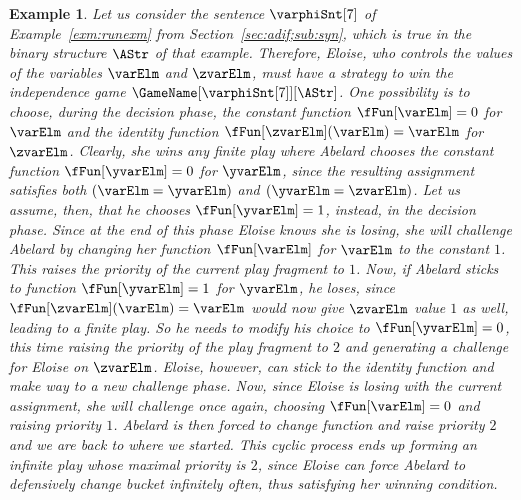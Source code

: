 \documentclass[authoryear]{elsarticle}
\newtheorem{example}{Example}
\begin{document}
\begin{example}
  \label{exm:runexmgam}
  Let us consider the sentence $\varphiSnt[7]$ of Example~\ref{exm:runexm} from
  Section~\ref{sec:adif;sub:syn}, which is true in the binary structure $\AStr$
  of that example.
  Therefore, Eloise, who controls the values of the variables $\varElm$ and
  $\zvarElm$, must have a strategy to win the independence game
  $\GameName[{\varphiSnt[7]}][\AStr]$.
  One possibility is to choose, during the decision phase, the constant function
  $\fFun[\varElm] = 0$ for $\varElm$ and the identity function
  $\fFun[\zvarElm](\varElm) = \varElm$ for $\zvarElm$.
  Clearly, she wins any finite play where Abelard chooses the constant function
  $\fFun[\yvarElm] = 0$ for $\yvarElm$, since the resulting assignment satisfies
  both $(\varElm = \yvarElm)$ and $(\yvarElm = \zvarElm)$.
  Let us assume, then, that he chooses $\fFun[\yvarElm] = 1$, instead, in the
  decision phase.
  Since at the end of this phase Eloise knows she is losing, she will challenge
  Abelard by changing her function $\fFun[\varElm]$ for $\varElm$ to the
  constant $1$.
  This raises the priority of the current play fragment to $1$.
  Now, if Abelard sticks to function $\fFun[\yvarElm] = 1$ for $\yvarElm$, he
  loses, since $\fFun[\zvarElm](\varElm) = \varElm$ would now give $\zvarElm$
  value $1$ as well, leading to a finite play.
  So he needs to modify his choice to $\fFun[\yvarElm] = 0$, this time raising
  the priority of the play fragment to $2$ and generating a challenge for
  Eloise on $\zvarElm$.
  Eloise, however, can stick to the identity function and make way to a new
  challenge phase.
  Now, since Eloise is losing with the current assignment, she will challenge
  once again, choosing $\fFun[\varElm] = 0$ and raising priority $1$.
  Abelard is then forced to change function and raise priority $2$ and we are
  back to where we started.
  This cyclic process ends up forming an infinite play whose maximal priority is
  $2$, since Eloise can force Abelard to defensively change bucket infinitely
  often, thus satisfying her winning condition.
\end{example}
\end{document}
